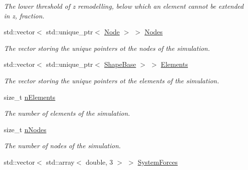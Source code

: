 \begin{DoxyCompactItemize}
\begin{DoxyCompactList}\small\item\em The lower threshold of z remodelling, below which an element cannot be extended in z, fraction. \end{DoxyCompactList}\item 
\hypertarget{classSimulation_aa6913c3f238cbf5455955b42bd617f72}{}std\+::vector$<$ std\+::unique\+\_\+ptr$<$ \hyperlink{classNode}{Node} $>$ $>$ \hyperlink{classSimulation_aa6913c3f238cbf5455955b42bd617f72}{Nodes}\label{classSimulation_aa6913c3f238cbf5455955b42bd617f72}

\begin{DoxyCompactList}\small\item\em The vector storing the unique pointers ot the nodes of the simulation. \end{DoxyCompactList}\item 
\hypertarget{classSimulation_a96e0aaea7b40dbb5bc11329fc7d34559}{}std\+::vector$<$ std\+::unique\+\_\+ptr$<$ \hyperlink{classShapeBase}{Shape\+Base} $>$ $>$ \hyperlink{classSimulation_a96e0aaea7b40dbb5bc11329fc7d34559}{Elements}\label{classSimulation_a96e0aaea7b40dbb5bc11329fc7d34559}

\begin{DoxyCompactList}\small\item\em The vector storing the unique pointers ot the elements of the simulation. \end{DoxyCompactList}\item 
\hypertarget{classSimulation_aa80589d220581f9b149e4316e732252f}{}size\+\_\+t \hyperlink{classSimulation_aa80589d220581f9b149e4316e732252f}{n\+Elements}\label{classSimulation_aa80589d220581f9b149e4316e732252f}

\begin{DoxyCompactList}\small\item\em The number of elements of the simulation. \end{DoxyCompactList}\item 
\hypertarget{classSimulation_ab779ac291bc517de8a598ab72094c1a6}{}size\+\_\+t \hyperlink{classSimulation_ab779ac291bc517de8a598ab72094c1a6}{n\+Nodes}\label{classSimulation_ab779ac291bc517de8a598ab72094c1a6}

\begin{DoxyCompactList}\small\item\em The number of nodes of the simulation. \end{DoxyCompactList}\item 
\hypertarget{classSimulation_aae01de5bcfd81ddeca987cdb6b054f54}{}std\+::vector$<$ std\+::array$<$ double, 3 $>$ $>$ \hyperlink{classSimulation_aae01de5bcfd81ddeca987cdb6b054f54}{System\+Forces}\label{classSimulation_aae01de5bcfd81ddeca987cdb6b054f54}


\end{DoxyCompactItemize}
